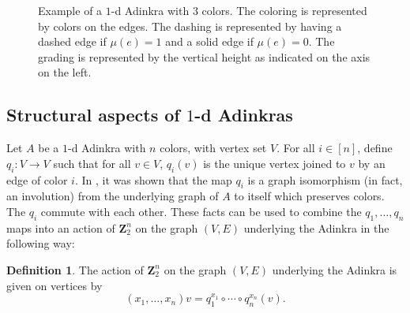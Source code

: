 \documentclass[12pt,twoside,singlespace]{article}
\numberwithin{equation}{section}
\theoremstyle{definition}
\newtheorem{definition}[equation]{Definition}
\newcommand{\ZZ}{\mathbf{Z}}
\begin{document}
\begin{figure}
\begin{center}
\caption{Example of a $1$-d Adinkra with $3$ colors. The coloring is represented by colors on the edges. The dashing is represented by having a dashed edge if $\mu(e)=1$ and a solid edge if $\mu(e)=0$. The grading is represented by the vertical height as indicated on the axis on the left.
\label{fig:1d-examples}}
\end{center}
\end{figure}


\subsection{Structural aspects of $1$-d Adinkras}
\label{sec:code}

 Let $A$ be a $1$-d Adinkra with $n$ colors, with vertex set $V$.  For all $i\in [n]$, define $q_i:V\to V$ such that for all $v\in V$, $q_i(v)$ is the unique vertex joined to $v$ by an edge of color $i$.  In \cite{d2l:omni}, it was shown that the map $q_i$ is a graph isomorphism (in fact, an involution) from the underlying graph of $A$ to itself which preserves colors. The $q_i$ commute with each other. These facts can be used to combine the $q_1,\ldots, q_n$ maps into an action of $\ZZ_2^n$ on the graph $(V,E)$ underlying the Adinkra in the following way:
\begin{definition}
The action of $\ZZ_2^n$ on the graph $(V,E)$ underlying the Adinkra is given on vertices by
\[(x_1,\ldots,x_n)v=q_1^{x_1}\circ\cdots\circ q_n^{x_n}(v).\]
\end{definition}
\end{document}
